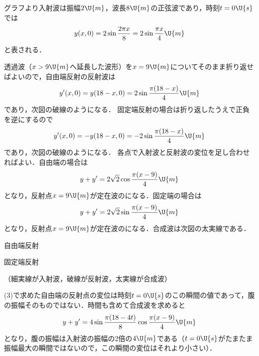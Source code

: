 \begin{reidaiunit}
\begin{kaitou}
\hspace{1zw}グラフより入射波は振幅$2\U{m}$，波長$8\U{m}$の正弦波であり，時刻$t=0\U{s}$では
\[y(x,0)=2\sin\frac{2\pi x}{8}=2\sin\frac{\pi x}{4}\U{m}\]
と表される．
\begin{komon}
 透過波（$x>9\U{m}$へ延長した波形）を$x=9\U{m}$についてそのまま折り返せばよいので，自由端反射の反射波は
       \[y^\prime(x,0)=y(18-x,0)=2\sin\frac{\pi(18-x)}{4}\U{m}\]
       であり，次図の破線のようになる．\hspace*{\fill}\Ans
{} 固定端反射の場合は折り返したうえで正負を逆にするので
       \[y^\prime(x,0)=-y(18-x,0)=-2\sin\frac{\pi(18-x)}{4}\U{m}\]
       であり，次図の破線のようになる．\hspace*{\fill}\Ans
{} 各点で入射波と反射波の変位を足し合わせればよい．自由端の場合は
       \[y+y^\prime=2\sqrt{2}\cos\frac{\pi(x-9)}{4}\U{m}\]
       となり，反射点$x=9\U{m}$が定在波のになる．固定端の場合は
       \[y+y^\prime=2\sqrt{2}\sin\frac{\pi(x-9)}{4}\U{m}\]
       となり，反射点$x=9\U{m}$が定在波のになる．合成波は次図の太実線である．\hspace*{\fill}\Ans
\end{komon}
\begin{center}
\begin{minipage}{74mm}\centering
{}自由端反射\\[1mm]
\end{minipage}\hfill
\begin{minipage}{74mm}\centering
{}固定端反射\\[1mm]
\end{minipage}
\end{center}
\hspace{1zw}（細実線が入射波，破線が反射波，太実線が合成波）

\begin{chuu}
(3)で求めた自由端の反射点の変位は{\gtfamily 時刻$t=0\U{s}$のこの瞬間の値}であって，腹の振幅そのものではない．時間も含めて合成波を求めると
\[y+y^\prime=4\sin\frac{\pi(18-4t)}{8}\cos\frac{\pi(x-9)}{4}\U{m}\]
となり，{\gtfamily 腹の振幅は入射波の振幅の2倍の$4\U{m}$}である（$t=0\U{s}$がたまたま振幅最大の瞬間ではないので，この瞬間の変位はそれより小さい）．
\end{chuu}
\end{kaitou}
\end{reidaiunit}

